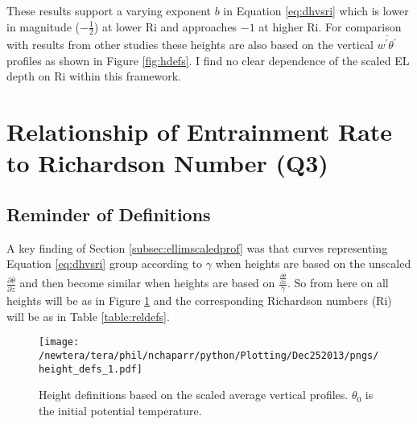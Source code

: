 These results support a varying exponent $b$ in Equation \ref{eq:dhvsri} which is lower in magnitude ($-\frac{1}{2}$) at lower \acs{Ri} and approaches $-1$ at higher \acs{Ri}.  For comparison with results from other studies these heights are also based on the vertical $\overline{w^{'}\theta^{'}}$ profiles as shown in Figure \ref{fig:hdefs}. I find no clear dependence of the scaled \acs{EL} depth on \acs{Ri} within this framework. \\

\clearpage

\section{Relationship of Entrainment Rate to Richardson Number (Q3)}
\label{sec:weri}
\FloatBarrier


\subsection{Reminder of Definitions}

A key finding of Section \ref{subsec:ellimscaledprof} was that curves representing Equation \ref{eq:dhvsri} group according
to $\gamma$ when heights are based on the unscaled $\frac{\partial \overline{\theta}}{\partial z}$ and then become similar
when heights are based on $\frac{\frac{\partial \overline{\theta}}{\partial z}}{\gamma}$.  So from here on all heights will be as in
Figure \ref{fig:hdefs1} and the corresponding Richardson numbers (\acs{Ri}) will be as in Table \ref{table:reldefs}.\\ 

\begin{figure}[htbp]
    \centering
    \texttt{[image: /newtera/tera/phil/nchaparr/python/Plotting/Dec252013/pngs/height\_defs\_1.pdf]}
    \caption[Height definitions]{Height definitions based on the scaled average vertical profiles. $\theta_{0}$ is the initial potential temperature.}
    \label{fig:hdefs1}   %
\end{figure}

